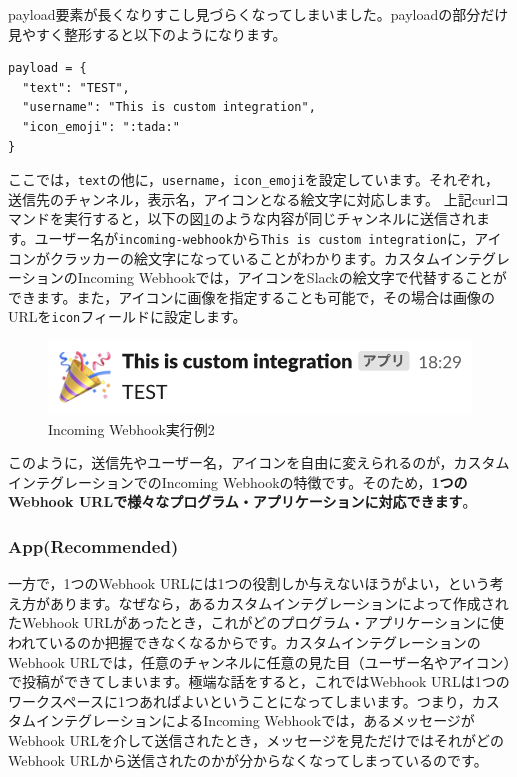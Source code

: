 \documentclass[uplatex,a4j]{jsarticle}
\begin{document}
payload要素が長くなりすこし見づらくなってしまいました。payloadの部分だけ見やすく整形すると以下のようになります。

\begin{lstlisting}[basicstyle=\ttfamily\footnotesize,frame=single,caption=Formed payload,label=formedpayload]
payload = {
  "text": "TEST",
  "username": "This is custom integration",
  "icon_emoji": ":tada:"
}
\end{lstlisting}

ここでは，\verb|text|の他に，\verb|username|，\verb|icon_emoji|を設定しています。それぞれ，送信先のチャンネル，表示名，アイコンとなる絵文字に対応します。
上記curlコマンドを実行すると，以下の図\ref{fig:webhook_sample3}のような内容が同じチャンネルに送信されます。ユーザー名が\verb|incoming-webhook|から\verb|This is custom integration|に，アイコンがクラッカーの絵文字になっていることがわかります。カスタムインテグレーションのIncoming Webhookでは，アイコンをSlackの絵文字で代替することができます。また，アイコンに画像を指定することも可能で，その場合は画像のURLを\verb|icon|フィールドに設定します。

\begin{figure}[h]
 \centering
 \includegraphics[keepaspectratio, scale=0.8]{images/webhook_sample3.png}
 \caption{Incoming Webhook実行例2}
 \label{fig:webhook_sample3}
\end{figure}

このように，送信先やユーザー名，アイコンを自由に変えられるのが，カスタムインテグレーションでのIncoming Webhookの特徴です。そのため，\textbf{1つのWebhook URLで様々なプログラム・アプリケーションに対応できます}。

\subsubsection{App(Recommended)}

一方で，1つのWebhook URLには1つの役割しか与えないほうがよい，という考え方があります。なぜなら，あるカスタムインテグレーションによって作成されたWebhook URLがあったとき，これがどのプログラム・アプリケーションに使われているのか把握できなくなるからです。カスタムインテグレーションのWebhook URLでは，任意のチャンネルに任意の見た目（ユーザー名やアイコン）で投稿ができてしまいます。極端な話をすると，これではWebhook URLは1つのワークスペースに1つあればよいということになってしまいます。つまり，カスタムインテグレーションによるIncoming Webhookでは，あるメッセージがWebhook URLを介して送信されたとき，メッセージを見ただけではそれがどのWebhook URLから送信されたのかが分からなくなってしまっているのです。
\end{document}
